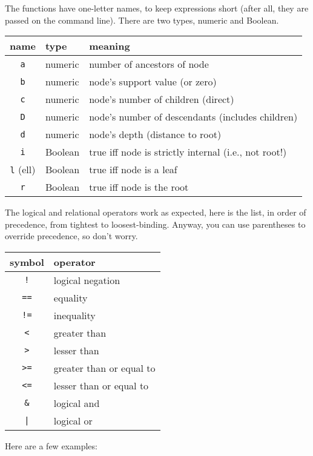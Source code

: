The functions have one-letter names, to keep expressions short (after all, they are passed on the command line). There are two types, numeric and Boolean.

\begin{center}
\begin{tabular}{cll}
name & type & meaning \\
\hline
\texttt{a} & numeric & number of ancestors of node	 \\
\texttt{b} & numeric & node's support value (or zero) \\
\texttt{c} & numeric & node's number of children (direct) \\
\texttt{D} & numeric & node's number of descendants (includes children) \\
\texttt{d} & numeric & node's depth (distance to root) \\
\texttt{i} & Boolean & true iff node is strictly internal (i.e., not root!) \\
\texttt{l} (ell) & Boolean & true iff node is a leaf \\
\texttt{r} & Boolean & true iff node is the root
\end{tabular}
\end{center}

The logical and relational operators work as expected, here is the list, in
order of precedence, from tightest to loosest-binding.  Anyway, you can use
parentheses to override precedence, so don't worry.

\begin{center}
\begin{tabular}{cl}
symbol & operator \\
\hline
\texttt{!} & logical negation \\
\hline
\texttt{==} & equality \\
\texttt{!=} & inequality \\
\texttt{<} & greater than \\
\texttt{>} & lesser than \\
\texttt{>=} & greater than or equal to \\
\texttt{<=} & lesser than or equal to \\
\hline
\texttt{\&} & logical and \\
\hline
\texttt{|} & logical or
\end{tabular}
\end{center}

\noindent{}Here are a few examples:

